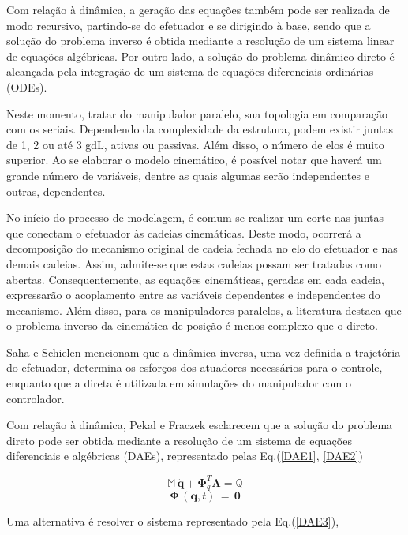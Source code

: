 \documentclass[]{politex}
\begin{document}
Com relação à dinâmica, a geração das equações também pode ser realizada de modo recursivo, partindo-se do efetuador e se dirigindo à base, sendo que a solução do problema inverso é obtida mediante a resolução de um sistema linear de equações algébricas. Por outro lado, a solução do problema dinâmico direto é alcançada pela integração de um sistema de equações diferenciais ordinárias (ODEs).

Neste momento, tratar do manipulador paralelo, sua topologia em comparação com os seriais. Dependendo da complexidade da estrutura, podem existir juntas de 1, 2 ou até 3 gdL, ativas ou passivas. Além disso, o número de elos é muito superior. Ao se elaborar o modelo cinemático, é possível notar que haverá um grande número de variáveis, dentre as quais algumas serão independentes e outras, dependentes. 

No início do processo de modelagem, é comum  se realizar um corte nas juntas que conectam o efetuador às cadeias cinemáticas. Deste modo, ocorrerá a decomposição do mecanismo original de cadeia fechada no elo do efetuador e nas demais cadeias. Assim, admite-se que estas cadeias possam ser tratadas como abertas. Consequentemente, as equações cinemáticas, geradas em cada cadeia, expressarão o acoplamento entre as variáveis dependentes e independentes do mecanismo. Além disso, para os manipuladores paralelos, a literatura destaca que o problema inverso da cinemática de posição é menos complexo que o direto. 

Saha e Schielen \cite{saha} mencionam que a dinâmica inversa, uma vez definida a trajetória do efetuador, determina os esforços dos atuadores necessários para o controle, enquanto que a direta é utilizada em simulações do manipulador com o controlador.

Com relação à dinâmica, Pekal e Fraczek \cite{pekal} esclarecem que a solução do problema direto pode ser obtida mediante a resolução de um sistema de equações diferenciais e algébricas (DAEs), representado pelas Eq.(\ref{DAE1}, \ref{DAE2})

\begin{equation}
\mathbb{M} \, \ddot{\mathbf{q}} + \boldsymbol{\Phi}_q^T \boldsymbol{\Lambda} = \mathbb{Q}
\label{DAE1}
\end{equation}
%
\begin{equation}
\boldsymbol{\Phi} \, (\mathbf{q},t) \, = \, \mathbf{0}
\label{DAE2}
\end{equation}

Uma alternativa é resolver o sistema representado pela Eq.(\ref{DAE3}), 
\end{document}
